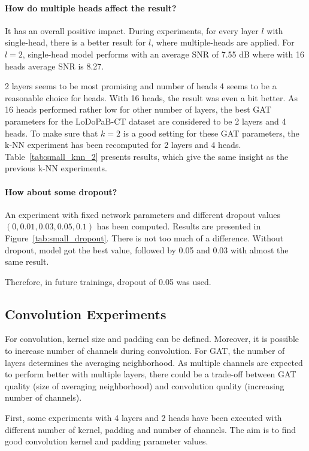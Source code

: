 \paragraph{How do multiple heads affect the result?}
It has an overall positive impact. 
During experiments, for every layer $l$ with single-head, there is a better result for $l$, where multiple-heads are applied. 
For $l=2$, single-head model performs with an average SNR of 7.55 dB where with 16 heads average SNR is 8.27.

2 layers seems to be most promising and number of heads 4 seems to be a reasonable choice for heads.
With 16 heads, the result was even a bit better. As 16 heads performed rather low for other number of layers, 
the best GAT parameters for the LoDoPaB-CT dataset are considered to be 2 layers and 4 heads.
To make sure that $k=2$ is a good setting for these GAT parameters, the k-NN experiment
has been recomputed for 2 layers and 4 heads. Table~\ref{tab:small_knn_2} presents results, which 
give the same insight as the previous k-NN experiments.

\paragraph{How about some dropout?}
An experiment with fixed network parameters
and different dropout values $(0, 0.01, 0.03, 0.05, 0.1)$ has been computed. 
Results are presented in Figure~\ref{tab:small_dropout}.
There is not too much of a difference. Without dropout, model got the best value, followed by 
0.05 and 0.03 with almost the same result. 

Therefore, in future trainings, dropout of 0.05 was used.

\subsection{Convolution Experiments}

For convolution, kernel size and padding can be defined.
Moreover, it is possible to increase number of channels during convolution. 
For GAT, the number of layers determines the averaging neighborhood.
As multiple channels are expected to perform better with multiple layers,
there could be a trade-off between GAT quality (size of averaging neighborhood) and convolution quality (increasing number of channels). 

First, some experiments with 4 layers and 2 heads have been executed with different number of kernel, padding and number of channels.
The aim is to find good convolution kernel and padding parameter values.

